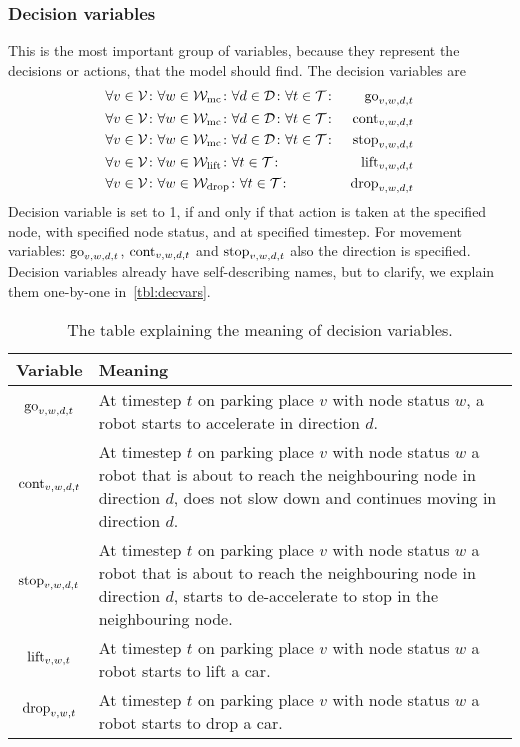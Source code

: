 \subsubsection{Decision variables}
This is the most important group of variables, because they represent the
decisions or actions, that the model should find. The decision variables are
\begin{align}
    &\forall v \in \mathcal{V} \colon \forall w \in \mathcal{W}_\mathrm{mc} \colon \forall d \in \mathcal{D} \colon
    \forall t \in \mathcal{T} \colon & \mathrm{go}_{v,w,d,t}\\
    &\forall v \in \mathcal{V} \colon \forall w \in \mathcal{W}_\mathrm{mc} \colon \forall d \in \mathcal{D} \colon
    \forall t \in \mathcal{T} \colon & \mathrm{cont}_{v,w,d,t}\\
    &\forall v \in \mathcal{V} \colon \forall w \in \mathcal{W}_\mathrm{mc} \colon \forall d \in \mathcal{D} \colon
    \forall t \in \mathcal{T} \colon & \mathrm{stop}_{v,w,d,t}\\
    &\forall v \in \mathcal{V} \colon \forall w \in \mathcal{W}_\mathrm{lift} \colon \forall t \in \mathcal{T} \colon &
    \mathrm{lift}_{v,w,d,t}\\
    &\forall v \in \mathcal{V} \colon \forall w \in \mathcal{W}_\mathrm{drop} \colon \forall t \in \mathcal{T} \colon &
    \mathrm{drop}_{v,w,d,t}
\end{align}
Decision variable is set to 1, if and only if that action is taken at the
specified node, with specified node status, and at specified timestep. For
movement variables: $\mathrm{go}_{v,w,d,t}$, $\mathrm{cont}_{v,w,d,t}$ and $\mathrm{stop}_{v,w,d,t}$
also the direction is specified. Decision variables already have
self-describing names, but to clarify, we explain them one-by-one
in~\autoref{tbl:decvars}.

\begin{table}[h]
    \center
    \begin{tabular}{| c | p{\textwidth - 2.6cm} |}
        \hline
        Variable & Meaning\\
        \hline
        $\mathrm{go}_{v,w,d,t}$ & At timestep $t$ on parking place $v$ with node status
        $w$, a robot starts to accelerate in direction $d$.\\ \hline
        $\mathrm{cont}_{v,w,d,t}$ & At timestep $t$ on parking place $v$ with node status
        $w$ a robot that is about to reach the neighbouring node in direction
        $d$, does not slow down and continues moving in direction $d$.\\ \hline
        $\mathrm{stop}_{v,w,d,t}$ & At timestep $t$ on parking place $v$ with node status
        $w$ a robot that is about to reach the neighbouring node in direction
        $d$, starts to de-accelerate to stop in the neighbouring node.\\ \hline
        $\mathrm{lift}_{v,w,t}$ & At timestep $t$ on parking place $v$ with node status
        $w$ a robot starts to lift a car.\\ \hline
        $\mathrm{drop}_{v,w,t}$ & At timestep $t$ on parking place $v$ with node status
        $w$ a robot starts to drop a car.\\
        \hline
    \end{tabular}
    \caption{The table explaining the meaning of decision variables.}
    \label{tbl:decvars}
\end{table}

